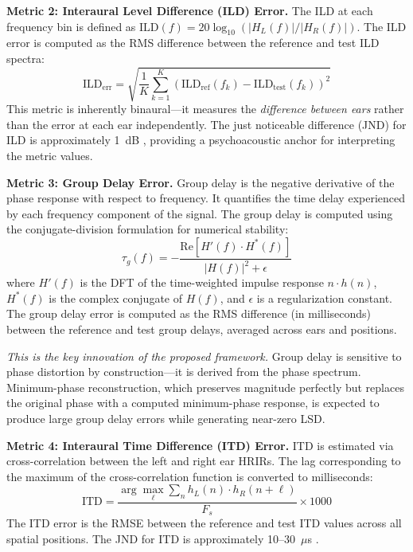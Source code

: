 \documentclass[12pt,a4paper]{article}
\begin{document}
\textbf{Metric 2: Interaural Level Difference (ILD) Error.}
The ILD at each frequency bin is defined as $\mathrm{ILD}(f) = 20 \log_{10}(|H_L(f)| / |H_R(f)|)$. The ILD error is computed as the RMS difference between the reference and test ILD spectra:
\begin{equation}
\mathrm{ILD}_{\mathrm{err}} = \sqrt{\frac{1}{K} \sum_{k=1}^{K} \left( \mathrm{ILD}_{\mathrm{ref}}(f_k) - \mathrm{ILD}_{\mathrm{test}}(f_k) \right)^2}
\label{eq:ild}
\end{equation}
This metric is inherently binaural---it measures the \textit{difference between ears} rather than the error at each ear independently. The just noticeable difference (JND) for ILD is approximately 1~dB \cite{blauert1997}, providing a psychoacoustic anchor for interpreting the metric values.

\textbf{Metric 3: Group Delay Error.}
Group delay is the negative derivative of the phase response with respect to frequency. It quantifies the time delay experienced by each frequency component of the signal. The group delay is computed using the conjugate-division formulation for numerical stability:
\begin{equation}
\tau_g(f) = -\frac{\mathrm{Re}\left[ H'(f) \cdot H^*(f) \right]}{|H(f)|^2 + \epsilon}
\label{eq:gd}
\end{equation}
where $H'(f)$ is the DFT of the time-weighted impulse response $n \cdot h(n)$, $H^*(f)$ is the complex conjugate of $H(f)$, and $\epsilon$ is a regularization constant. The group delay error is computed as the RMS difference (in milliseconds) between the reference and test group delays, averaged across ears and positions.

\textit{This is the key innovation of the proposed framework.} Group delay is sensitive to phase distortion by construction---it is derived from the phase spectrum. Minimum-phase reconstruction, which preserves magnitude perfectly but replaces the original phase with a computed minimum-phase response, is expected to produce large group delay errors while generating near-zero LSD.

\textbf{Metric 4: Interaural Time Difference (ITD) Error.}
ITD is estimated via cross-correlation between the left and right ear HRIRs. The lag corresponding to the maximum of the cross-correlation function is converted to milliseconds:
\begin{equation}
\mathrm{ITD} = \frac{\arg\max_{\ell} \sum_n h_L(n) \cdot h_R(n + \ell)}{F_s} \times 1000
\label{eq:itd}
\end{equation}
The ITD error is the RMSE between the reference and test ITD values across all spatial positions. The JND for ITD is approximately 10--30~$\mu$s \cite{blauert1997}.
\end{document}
